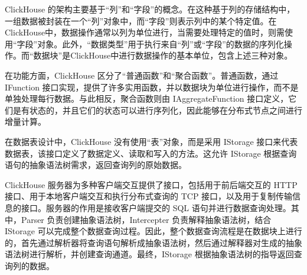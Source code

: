 ClickHouse 的架构主要基于“列”和“字段”的概念。在这种基于列的存储结构中，一组数据被封装在一个“列”对象中，而“字段”则表示列中的某个特定值。在ClickHouse中，数据操作通常以列为单位进行，当需要处理特定的值时，则需使用“字段”对象。此外，“数据类型”用于执行来自“列”或“字段”的数据的序列化操作。而“数据块”是ClickHouse中进行数据操作的基本单位，包含上述三种对象。

在功能方面，ClickHouse 区分了“普通函数”和“聚合函数”。普通函数，通过 IFunction 接口实现，提供了许多实用函数，并以数据块为单位进行操作，而不是单独处理每行数据。与此相反，聚合函数则由 IAggregateFunction 接口定义，它们是有状态的，并且它们的状态可以进行序列化，因此能够在分布式节点之间进行增量计算。

在数据表设计中，ClickHouse 没有使用“表”对象，而是采用 IStorage 接口来代表数据表，该接口定义了数据定义、读取和写入的方法。这允许 IStorage 根据查询语句的抽象语法树需求，返回查询列的原始数据。

ClickHouse 服务器为多种客户端交互提供了接口，包括用于前后端交互的 HTTP 接口、用于本地客户端交互和执行分布式查询的 TCP 接口，以及用于复制传输信息的接口。服务器的作用是接收客户端提交的 SQL 语句并进行数据查询处理。其中，Parser 负责创建抽象语法树，Intercepter 负责解释抽象语法树，结合 IStorage 可以完成整个数据查询过程。因此，整个数据查询流程是在数据块上进行的，首先通过解析器将查询语句解析成抽象语法树，然后通过解释器对生成的抽象语法树进行解析，并创建查询通道。最终，IStorage 根据抽象语法树的指导返回查询列的数据。